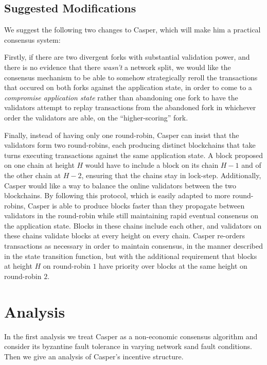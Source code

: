 \documentclass[11pt,a4paper]{article}
\begin{document}
\subsection{Suggested Modifications}

We suggest the following two changes to Casper, which will make him a practical consensus system:

Firstly, if there are two divergent forks with substantial validation power, and there is no evidence that there \emph{wasn't} a network split, we would like the consensus mechanism to be able to somehow strategically reroll the transactions that occured on both forks against the application state, in order to come to a \emph{compromise application state} rather than abandoning one fork to have the validators attempt to replay transactions from the abandoned fork in whichever order the validators are able, on the ``higher-scoring'' fork. 

Finally, instead of having only one round-robin, Casper can insist that the validators form two round-robins, each producing distinct blockchains that take turns executing transactions against the same application state. A block proposed on one chain at height $H$ would have to include a block on its chain $H-1$ and of the other chain at $H-2$, ensuring that the chains stay in lock-step. Additionally, Casper would like a way to balance the online validators between the two blockchains. By following this protocol, which is easily adapted to more round-robins, Casper is able to produce blocks faster than they propagate between validators in the round-robin while still maintaining rapid eventual consensus on the application state. Blocks in these chains include each other, and validators on these chains validate blocks at every height on every chain. Casper re-orders transactions as necessary in order to maintain consensus, in the manner described in the state transition function, but with the additional requirement that blocks at height $H$ on round-robin $1$ have priority over blocks at the same height on round-robin $2$.


\section{Analysis}

In the first analysis we treat Casper as a non-economic consensus algorithm and consider its byzantine fault tolerance in varying network sand fault conditions. Then we give an analysis of Casper's incentive structure.
\end{document}
